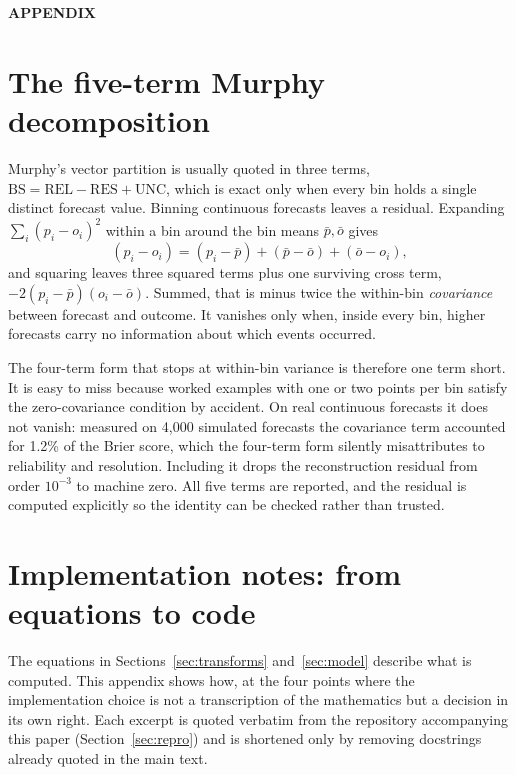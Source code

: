 \documentclass[11pt,a4paper]{article}
\begin{document}
\clearpage
\thispagestyle{plain}
\vspace*{\fill}
\begin{center}
{\Huge\bfseries APPENDIX}
\end{center}
\vspace*{\fill}
\clearpage

\begin{appendices}

\section{The five-term Murphy decomposition}
\label{app:murphy}

Murphy's vector partition \citep{murphy1973} is usually quoted in three terms,
$\mathrm{BS} = \mathrm{REL} - \mathrm{RES} + \mathrm{UNC}$, which is exact only
when every bin holds a single distinct forecast value. Binning continuous
forecasts leaves a residual. Expanding $\sum_i (p_i - o_i)^2$ within a bin
around the bin means $\bar p, \bar o$ gives
\begin{equation}
  (p_i - o_i) = (p_i - \bar p) + (\bar p - \bar o) + (\bar o - o_i),
\end{equation}
and squaring leaves three squared terms plus one surviving cross term,
$-2(p_i - \bar p)(o_i - \bar o)$. Summed, that is minus twice the within-bin
\emph{covariance} between forecast and outcome. It vanishes only when, inside
every bin, higher forecasts carry no information about which events occurred.

The four-term form that stops at within-bin variance is therefore one term
short. It is easy to miss because worked examples with one or two points per
bin satisfy the zero-covariance condition by accident. On real continuous
forecasts it does not vanish: measured on 4{,}000 simulated forecasts the
covariance term accounted for 1.2\% of the Brier score, which the four-term
form silently misattributes to reliability and resolution. Including it drops
the reconstruction residual from order $10^{-3}$ to machine zero. All five
terms are reported, and the residual is computed explicitly so the identity can
be checked rather than trusted.

\section{Implementation notes: from equations to code}
\label{app:code}

The equations in Sections~\ref{sec:transforms} and~\ref{sec:model} describe
what is computed. This appendix shows how, at the four points where the
implementation choice is not a transcription of the mathematics but a
decision in its own right. Each excerpt is quoted verbatim from the
repository accompanying this paper (Section~\ref{sec:repro}) and is
shortened only by removing docstrings already quoted in the main text.


\end{appendices}
\end{document}

